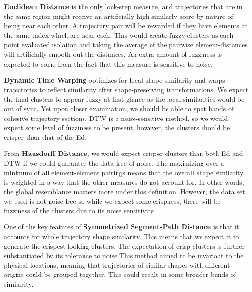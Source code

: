 \textbf{Euclidean Distance} is the only lock-step measure, and trajectories that are in the same region might receive an artificially high similarly score by nature of being near each other. 
A trajectory pair will be rewarded if they have elements at the same index which are near each.
This would create fuzzy clusters as each point evaluated isolation and taking the average of the pairwise element-distances will artificially smooth out the distances.
An extra amount of fuzziness is expected to come from the fact that this measure is sensitive to noise. 


\clearpage
\textbf{Dynamic Time Warping}  optimizes for local shape similarity and warps trajectories to reflect similarity after shape-preserving transformations.
We expect the final clusters to appear fuzzy at first glance as the local similarities would be out of sync. 
Yet upon closer examination, we should be able to spot bands of cohesive trajectory sections. 
DTW is a noise-sensitive method, so we would expect some level of fuzziness to be present, however, the clusters should be crisper than that of the Ed. 



From \textbf{Hausdorff Distance}, we would expect crisper clusters than both Ed and DTW if we could guarantee the data free of noise.
The maximizing over a minimum of all element-element pairings means that the overall shape similarity is weighted in a way that the other measures do not account for. 
In other words, the global resemblance matters more under this definition. 
However, the data set we used is not noise-free so while we expect some crispness, there will be fuzziness of the clusters due to its noise sensitivity.


One of the key features of \textbf{Symmetrized Segment-Path Distance} is that it accounts for whole trajectory shape similarity. 
This means that we expect it to generate the crispest looking clusters. 
The expectation of crisp clusters is further substantiated by its tolerance to noise
This method aimed to be invariant to the physical locations, meaning that trajectories of similar shapes with different origins could be grouped together. This could result in some broader bands of similarity.

